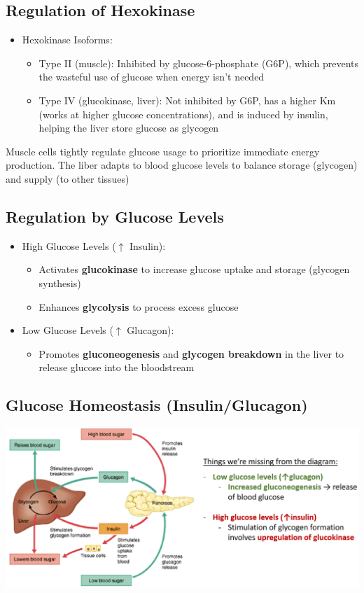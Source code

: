\documentclass[10pt]{article}
\begin{document}
\subsection*{Regulation of Hexokinase}
\begin{itemize}
	\item Hexokinase Isoforms:
	\begin{itemize}
        \item Type II (muscle): Inhibited by glucose-6-phosphate (G6P), which prevents the wasteful use of glucose when energy isn't needed
        \item Type IV (glucokinase, liver): Not inhibited by G6P, has a higher Km (works at higher glucose concentrations), and is induced by insulin, helping the liver store glucose as glycogen
    \end{itemize}
\end{itemize}
Muscle cells tightly regulate glucose usage to prioritize immediate energy production.  The liber adapts to blood glucose levels to balance storage (glycogen) and supply (to other tissues)

\subsection*{Regulation by Glucose Levels}
\begin{itemize}
	\item High Glucose Levels ($\uparrow$ Insulin):
	\begin{itemize}
        \item Activates \textbf{glucokinase} to increase glucose uptake and storage (glycogen synthesis)
        \item Enhances \textbf{glycolysis} to process excess glucose
    \end{itemize}
	\item Low Glucose Levels ($\uparrow$ Glucagon):
	\begin{itemize}
        \item Promotes \textbf{gluconeogenesis} and \textbf{glycogen breakdown} in the liver to release glucose into the bloodstream
    \end{itemize}
\end{itemize}

\subsection*{Glucose Homeostasis (Insulin/Glucagon)}
\begin{center} 
	\includegraphics*[width=\textwidth]{L2_2.png} 
\end{center}
\end{document}

